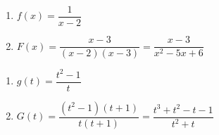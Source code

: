 \begin{multicols}{2}
\begin{enumerate}
\setcounter{enumi}{\value{HW}}

\item $f(x) = \dfrac{1}{x - 2}$
\item $F(x) = \dfrac{x-3}{(x-2)(x-3)} = \dfrac{x-3}{x^2-5x+6}$

\setcounter{HW}{\value{enumi}}
\end{enumerate}
\end{multicols}

\begin{multicols}{2}
\begin{enumerate}
\setcounter{enumi}{\value{HW}}


\item $g(t) =\dfrac{t^2-1}{t}$
\item $G(t) = \dfrac{(t^2-1)(t+1)}{t(t+1)} = \dfrac{t^3+t^2-t-1}{t^2+t}$ 


\setcounter{HW}{\value{enumi}}
\end{enumerate}
\end{multicols}
